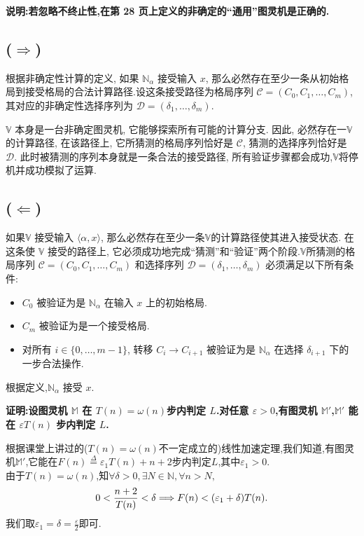 \documentclass{homework}
\begin{document}
\question \textbf{说明:若忽略不终止性,在第 28 页上定义的非确定的“通用”图灵机是正确的.}
\begin{sol}

	
	\subsection*{($\Rightarrow$) }
	根据非确定性计算的定义, 如果 $\mathbb{N}_\alpha$ 接受输入 $x$, 那么必然存在至少一条从初始格局到接受格局的合法计算路径.设这条接受路径为格局序列 $\mathcal{C} = (C_0, C_1, \dots, C_m)$, 其对应的非确定性选择序列为 $\mathcal{D} = (\delta_1, \dots, \delta_m)$.
	
 $\mathbb{V}$ 本身是一台非确定图灵机, 它能够探索所有可能的计算分支. 因此, 必然存在一$\mathbb{V}$的计算路径, 在该路径上, 它所猜测的格局序列恰好是 $\mathcal{C}$, 猜测的选择序列恰好是 $\mathcal{D}$. 此时被猜测的序列本身就是一条合法的接受路径, 所有验证步骤都会成功,$\mathbb{V}$将停机并成功模拟了运算.
			
	\subsection*{($\Leftarrow$) }
	如果$\mathbb{V}$ 接受输入 $\langle \alpha, x \rangle$, 那么必然存在至少一条$\mathbb{V}$的计算路径使其进入接受状态.
在这条使 $\mathbb{V}$ 接受的路径上, 它必须成功地完成“猜测”和“验证”两个阶段.$\mathbb{V}$所猜测的格局序列 $\mathcal{C} = (C_0, C_1, \dots, C_m)$ 和选择序列 $\mathcal{D} = (\delta_1, \dots, \delta_m)$ 必须满足以下所有条件:
		\begin{itemize}
			\item  $C_0$ 被验证为是 $\mathbb{N}_\alpha$ 在输入 $x$ 上的初始格局.
			\item  $C_m$ 被验证为是一个接受格局.
			\item  对所有 $i \in \{0, \dots, m-1\}$, 转移 $C_i \to C_{i+1}$ 被验证为是 $\mathbb{N}_\alpha$ 在选择 $\delta_{i+1}$ 下的一步合法操作.
		\end{itemize}
根据定义,$\mathbb{N}_\alpha$  接受 $x$.


\end{sol}

\question \textbf{证明:设图灵机 $\mathbb{M}$ 在 $T(n) = \omega(n)$步内判定 $L$.对任意 $\varepsilon > 0$,有图灵机 $\mathbb{M}'$,$\mathbb{M}'$ 能在 $\varepsilon T(n)$ 步内判定 $L$.}


\begin{sol}
	根据课堂上讲过的($T(n) = \omega(n)$不一定成立的)线性加速定理,我们知道,有图灵机$\mathbb{M}'$,它能在$F(n)\stackrel{\Delta}{=}\varepsilon_1 T(n) + n + 2 $步内判定$L$,其中$\varepsilon_1 > 0$.\\
	由于$T(n) = \omega(n)$,知$\forall \delta > 0 , \exists N \in \mathbb{N}, \forall n > N , $
	\[
	 0 <	\frac{n+2}{T(n)} < \delta\\
	 \Longrightarrow  F(n) < (\varepsilon_1 + \delta)T(n).
	\]
	我们取$\varepsilon_1 = \delta = \frac{\varepsilon}{2}$即可.
	
\end{sol}
\end{document}
